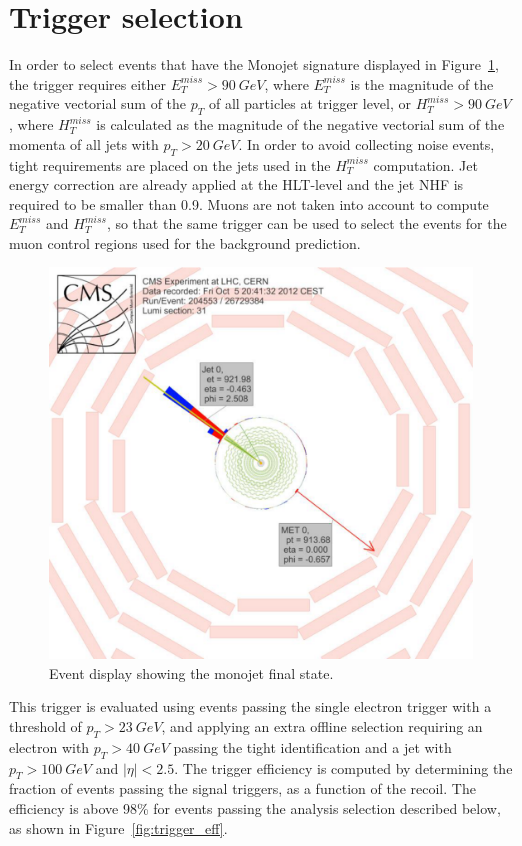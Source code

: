 \section{Trigger selection}
\label{sec:monojet_trigger}

In order to select events that have the Monojet signature displayed in Figure~\ref{fig:monojet_display}, the trigger requires either $E_T^{miss} > \SI{90}{GeV}$, where $E_T^{miss}$ is the magnitude of the negative vectorial sum of the $p_T$ of all particles at trigger level, or $H_T^ {miss} > \SI{90}{GeV}$, where $H_T^{miss}$ is calculated as the magnitude of the negative vectorial sum of the momenta of all jets with $p_T > \SI{20}{GeV}$. In order to avoid collecting noise events, tight requirements are placed on the jets used in the $H_T^{miss}$ computation. Jet energy correction are already applied at the \ac{HLT}-level and the jet NHF is required to be smaller than 0.9. Muons are not taken into account to compute $E_T^{miss}$ and $H_T^{miss}$, so that the same trigger can be used to select the events for the muon control regions used for the background prediction.

\begin{figure}[ht]
  \centering
 \includegraphics[width=.6\textwidth]{monojet_event.pdf} 
 \caption{Event display showing the monojet final state.}
 \label{fig:monojet_display}
\end{figure}

This trigger is evaluated using events passing the single electron trigger with a threshold of $p_T > \SI{23}{GeV}$, and applying an extra offline selection requiring an electron with $p_T > \SI{40}{GeV}$ passing the tight identification and a jet with $p_T > \SI{100}{GeV}$ and $|\eta| < 2.5$. The trigger efficiency is computed by determining the fraction of events passing the signal triggers, as a function of the recoil. The efficiency is above 98\% for events passing the analysis selection described below, as shown in Figure~\ref{fig:trigger_eff}.

